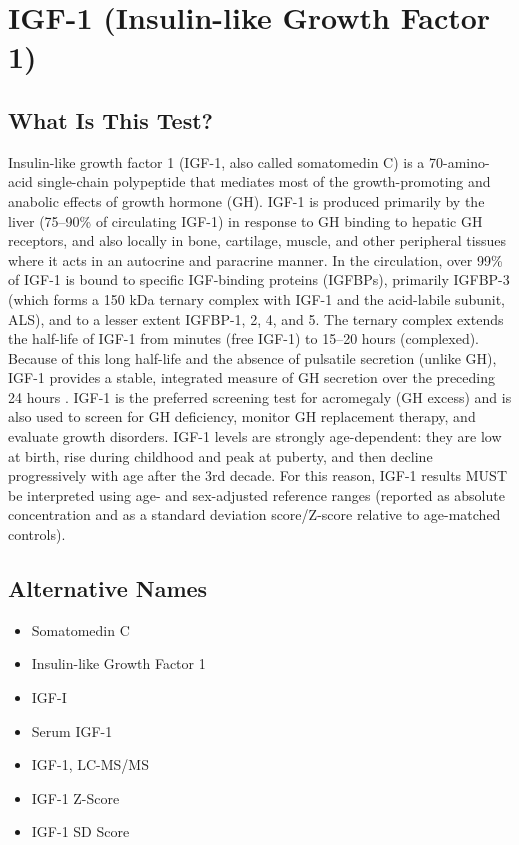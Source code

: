 \chapter{IGF-1 (Insulin-like Growth Factor 1)}

\section*{What Is This Test?}
Insulin-like growth factor 1 (IGF-1, also called somatomedin C) is a 70-amino-acid single-chain polypeptide that mediates most of the growth-promoting and anabolic effects of growth hormone (GH). IGF-1 is produced primarily by the liver (75--90\% of circulating IGF-1) in response to GH binding to hepatic GH receptors, and also locally in bone, cartilage, muscle, and other peripheral tissues where it acts in an autocrine and paracrine manner. In the circulation, over 99\% of IGF-1 is bound to specific IGF-binding proteins (IGFBPs), primarily IGFBP-3 (which forms a 150 kDa ternary complex with IGF-1 and the acid-labile subunit, ALS), and to a lesser extent IGFBP-1, 2, 4, and 5. The ternary complex extends the half-life of IGF-1 from minutes (free IGF-1) to 15--20 hours (complexed). Because of this long half-life and the absence of pulsatile secretion (unlike GH), IGF-1 provides a stable, integrated measure of GH secretion over the preceding 24 hours \cite{leroith1997seminars}. IGF-1 is the preferred screening test for acromegaly (GH excess) and is also used to screen for GH deficiency, monitor GH replacement therapy, and evaluate growth disorders. IGF-1 levels are strongly age-dependent: they are low at birth, rise during childhood and peak at puberty, and then decline progressively with age after the 3rd decade. For this reason, IGF-1 results MUST be interpreted using age- and sex-adjusted reference ranges (reported as absolute concentration and as a standard deviation score/Z-score relative to age-matched controls).

\section*{Alternative Names}
\begin{itemize}
  \item Somatomedin C
  \item Insulin-like Growth Factor 1
  \item IGF-I
  \item Serum IGF-1
  \item IGF-1, LC-MS/MS
  \item IGF-1 Z-Score
  \item IGF-1 SD Score
\end{itemize}
